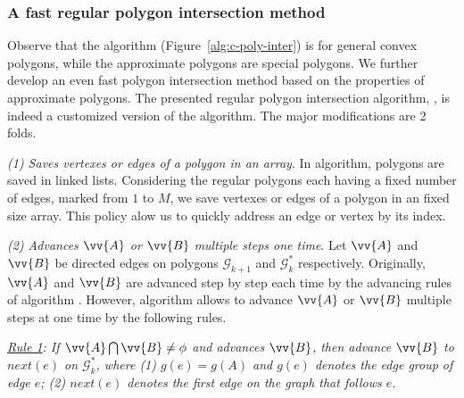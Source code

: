 



\subsubsection{A fast regular polygon intersection method}


Observe that the \cpia algorithm (Figure~\ref{alg:c-poly-inter}) is for general convex polygons, while the approximate polygons are special polygons. We further develop an even fast polygon intersection method based on the properties of approximate polygons.
%
The presented regular polygon intersection algorithm, \ie \rpia, is indeed a customized version of the \cpia algorithm.
The major modifications are 2 folds.

\vspace{1ex}
\ni \emph{{(1) Saves vertexes or edges of a polygon in an array}}.
In \cpia algorithm, polygons are saved in linked lists.
Considering the regular polygons each having a fixed number of edges, marked from $1$ to $M$, we save vertexes or edges of a polygon in an fixed size array. This policy alow us to quickly address an edge or vertex by its index.


\vspace{1ex}
\ni \emph{(2) Advances $\vv{A}$ or $\vv{B}$ multiple steps one time}.
Let $\vv{A}$ and $\vv{B}$ be directed edges on polygons $\mathcal{G}_{k+1}$ and $\mathcal{G}^*_k$ respectively.
Originally, $\vv{A}$ and $\vv{B}$ are advanced step by step each time by the advancing rules of algorithm \cpia .
%
However, algorithm \rpia allows to advance $\vv{A}$ or $\vv{B}$ multiple steps at one time by the following rules.


\vspace{1ex}
\ni \emph{\underline{Rule 1}:
If $\vv{A} \bigcap \vv{B} \ne \phi$ and advances $\vv{B}$, then advance $\vv{B}$ to $next(e)$ on $\mathcal{G}^*_k$, where (1) $g(e) = g({A})$ and $g(e)$ denotes the edge group of edge $e$; (2) $next(e)$ denotes the first edge on the graph that follows $e$.}
\vspace{1ex}

